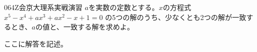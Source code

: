 \begin{prob}{064}{}{Z会京大理系実戦演習}
 $a$を実数の定数とする。$x$の方程式 $x^5-x^4+ax^3+ax^2-x+1=0$ の5つの解のうち、少なくとも2つの解が一致するとき、$a$の値と、一致する解を求めよ。
\end{prob}
ここに解答を記述。